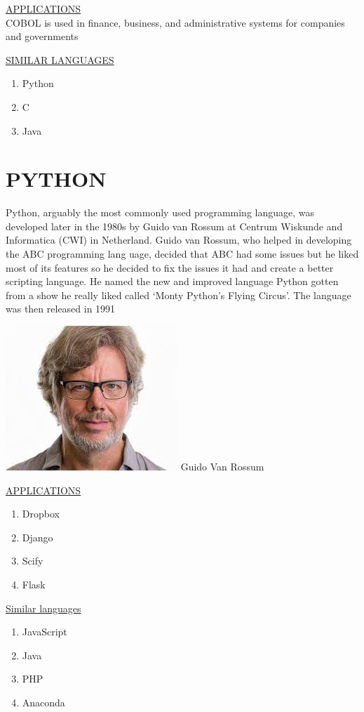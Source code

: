 \documentclass{article}
\begin{document}
\newpage
\underline{APPLICATIONS}\\
          COBOL is used in finance, business, and
          administrative systems for companies and governments

\underline{SIMILAR LANGUAGES}\\
\begin{enumerate}
	\item Python
	\item C
	\item Java
\end{enumerate}

\newpage
\section{\textbf{PYTHON}}
Python, arguably the most commonly used programming language, was developed later in the 1980s by Guido van Rossum at Centrum Wiskunde and Informatica (CWI) in Netherland. 
Guido van Rossum, who helped in developing the ABC programming lang  uage, decided that ABC had some issues but he liked most of its features so he decided to fix the issues it had and create a better scripting language. He named the new and improved language Python gotten from a show he really liked called ‘Monty Python’s Flying Circus’.
The language was then released in 1991


\newpage
\includegraphics{guido.jpg}
{Guido Van Rossum}
\newpage

\underline{APPLICATIONS}

\begin{enumerate}
\item Dropbox
\item Django
\item Scify
\item Flask
\end{enumerate}


\underline{Similar languages}

\begin{enumerate}
	\item JavaScript
	\item Java
	\item PHP
	\item Anaconda
	
\end{enumerate}
\end{document}
